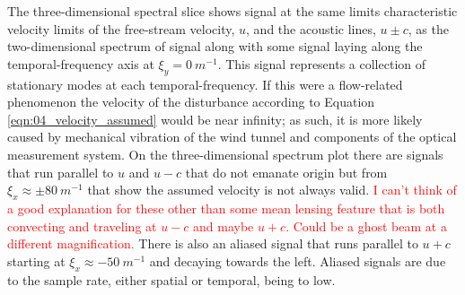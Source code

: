 The three-dimensional spectral slice shows signal at the same limits characteristic velocity limits of the free-stream velocity, $u$, and the acoustic lines, $u\pm c$, as the two-dimensional spectrum of signal along with some signal laying along the temporal-frequency axis at $\xi_y=0\ m^{-1}$.
This signal represents a collection of stationary modes at each temporal-frequency.
If this were a flow-related phenomenon the velocity of the disturbance according to Equation \ref{eqn:04_velocity_assumed} would be near infinity; as such, it is more likely caused by mechanical vibration of the wind tunnel and components of the optical measurement system.
On the three-dimensional spectrum plot there are signals that run parallel to $u$ and $u-c$ that do not emanate origin but from $\xi_x\approx\pm80\ m^{-1}$ that show the assumed velocity is not always valid.
\textcolor{red}{I can't think of a good explanation for these other than some mean lensing feature that is both convecting and traveling at $u-c$ and maybe $u+c$. Could be a ghost beam at a different magnification.}
There is also an aliased signal that runs parallel to $u+c$ starting at $\xi_x\approx-50\ m^{-1}$ and decaying towards the left.
Aliased signals are due to the sample rate, either spatial or temporal, being to low.

